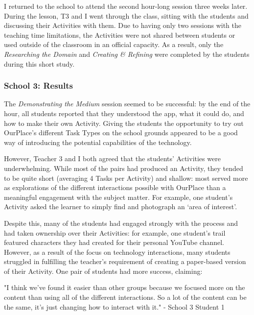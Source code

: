 I returned to the school to attend the second hour-long session three weeks later. During the lesson, T3 and I went through the class, sitting with the students and discussing their Activities with them. Due to having only two sessions with the teaching time limitations, the Activities were not shared between students or used outside of the classroom in an official capacity. As a result, only the \textit{Researching the Domain} and \textit{Creating \& Refining} were completed by the students during this short study.

\subsubsection{School 3: Results}

The \textit{Demonstrating the Medium} session seemed to be successful: by the end of the hour, all students reported that they understood the app, what it could do, and how to make their own Activity. Giving the students the opportunity to try out OurPlace's different Task Types on the school grounds appeared to be a good way of introducing the potential capabilities of the technology.

However, Teacher 3 and I both agreed that the students' Activities were underwhelming. While most of the pairs had produced an Activity, they tended to be quite short (averaging 4 Tasks per Activity) and shallow: most served more as explorations of the different interactions possible with OurPlace than a meaningful engagement with the subject matter. For example, one student's Activity asked the learner to simply find and photograph an `area of interest'.

Despite this, many of the students had engaged strongly with the process and had taken ownership over their Activities: for example, one student's trail featured characters they had created for their personal YouTube channel. However, as a result of the focus on technology interactions, many students struggled in fulfilling the teacher's requirement of creating a paper-based version of their Activity. One pair of students had more success, claiming:

\begin{displayquote}
"I think we've found it easier than other groups because we focused more on the content than using all of the different interactions. So a lot of the content can be the same, it's just changing how to interact with it." - School 3 Student 1
\end{displayquote}

